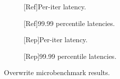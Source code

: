 \begin{figure}[t]
    \centering
    \begin{subfigure}[b]{.24\linewidth}
        \centering
        \caption{\label{fig:5a:refoverwrite-iter-latency}[Ref]Per-iter latency.}
    \end{subfigure}
    \hfill
    \begin{subfigure}[b]{.24\linewidth}
        \centering
        \caption{\label{fig:5b:ref:overwrite-delay-p99-latency-sample}[Ref]99.99 percentile latencies.}
    \end{subfigure}
    \hfill
    \begin{subfigure}[b]{.24\linewidth}
        \centering
        \caption{\label{fig:5a:repoverwrite-iter-latency}[Rep]Per-iter latency.}
    \end{subfigure}
    \hfill
    \begin{subfigure}[b]{.24\linewidth}
        \centering
        \caption{\label{fig:5b:rep:overwrite-delay-p99-latency-sample}[Rep]99.99 percentile latencies.}
    \end{subfigure}

    \caption{\label{fig:5:overwrite}Overwrite microbenchmark results.}
\end{figure}
